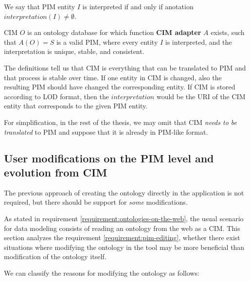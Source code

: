 
\begin{definition}[interpretation]
    We say that PIM entity $I$ is interpreted if and only if anotation $interpretation(I) \neq \emptyset$.
\end{definition}

\begin{definition}[CIM]
    CIM $O$ is an ontology database for which function \textbf{CIM adapter} $A$ exists, such that $A(O) = S$ is a valid PIM, where every entity $I$ is interpreted, and the interpretation is unique, stable, and consistent.
\end{definition}

The definitions tell us that CIM is everything that can be translated to PIM and that process is stable over time. If one entity in CIM is changed, also the resulting PIM should have changed the corresponding entity. If CIM is stored according to LOD format, then the $interpretation$ would be the URI of the CIM entity that corresponds to the given PIM entity.

For simplification, in the rest of the thesis, we may omit that CIM \textit{needs to be translated} to PIM and suppose that it is already in PIM-like format.




\newpage\subsection{User modifications on the PIM level and evolution from CIM}

\begin{requirement}
    \label{requirement:pim-editing}
    The previous approach of creating the ontology directly in the application is not required, but there should be support for \textit{some} modifications.
\end{requirement}

As stated in requirement \ref{requirement:ontologies-on-the-web}, the usual scenario for data modeling consists of reading an ontology from the web as a CIM. This section analyzes the requirement \ref{requirement:pim-editing}, whether there exist situations where modifying the ontology in the tool may be more beneficial than modification of the ontology itself.

We can classify the reasons for modifying the ontology as follows:

